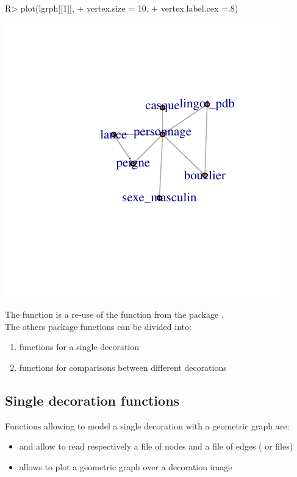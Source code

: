 \documentclass[article]{jss}
\begin{document}
\begin{Schunk}
\begin{Sinput}
R> plot(lgrph[[1]],
+       vertex.size = 10,
+       vertex.label.cex =.8)
\end{Sinput}
\end{Schunk}
\includegraphics{article_rvTH12-plotg}

The  function is a re-use of the  function from the  package \citep{Snow20}.\\

The others  package functions can be divided into:
\begin{enumerate}
 \item functions for a single decoration
 \item functions for comparisons between different decorations
\end{enumerate}

\subsection{Single decoration functions} \label{sec:functions_one}

Functions allowing to model a single decoration with a geometric graph are:

\begin{itemize}
  \item {} and  allow to read respectively a file of nodes and a file of edges ( or  files)
  \item {} allows to plot a geometric graph over a decoration image
\end{itemize}
\end{document}
